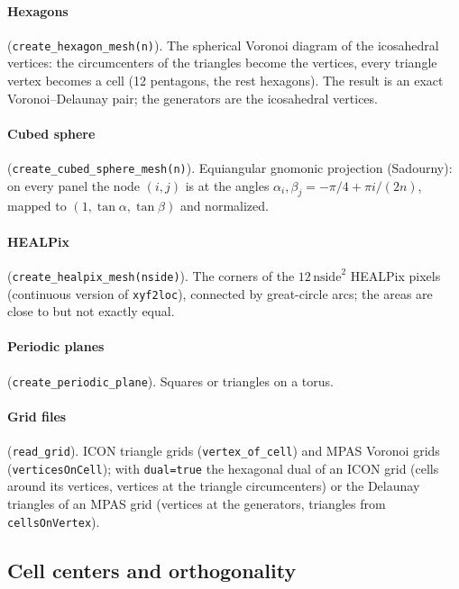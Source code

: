 \documentclass[11pt,a4paper]{article}
\newcommand{\code}[1]{\texttt{#1}}
\begin{document}
\paragraph{Hexagons} (\code{create\_hexagon\_mesh(n)}). The spherical Voronoi
diagram of the icosahedral vertices: the circumcenters of the triangles become
the vertices, every triangle vertex becomes a cell (12 pentagons, the rest
hexagons). The result is an exact Voronoi--Delaunay pair; the generators are
the icosahedral vertices.

\paragraph{Cubed sphere} (\code{create\_cubed\_sphere\_mesh(n)}). Equiangular
gnomonic projection (Sadourny): on every panel the node $(i,j)$ is at the
angles $\alpha_i,\beta_j = -\pi/4 + \pi i/(2n)$, mapped to
$(1,\tan\alpha,\tan\beta)$ and normalized.

\paragraph{HEALPix} (\code{create\_healpix\_mesh(nside)}). The corners of the
$12\,\mathrm{nside}^2$ HEALPix pixels (continuous version of
\code{xyf2loc}), connected by great-circle arcs; the areas are close to but not
exactly equal.

\paragraph{Periodic planes} (\code{create\_periodic\_plane}). Squares or
triangles on a torus.

\paragraph{Grid files} (\code{read\_grid}). ICON triangle grids
(\code{vertex\_of\_cell}) and MPAS Voronoi grids (\code{verticesOnCell}); with
\code{dual=true} the hexagonal dual of an ICON grid (cells around its vertices,
vertices at the triangle circumcenters) or the Delaunay triangles of an MPAS grid
(vertices at the generators, triangles from \code{cellsOnVertex}).

\subsection{Cell centers and orthogonality}
\end{document}
